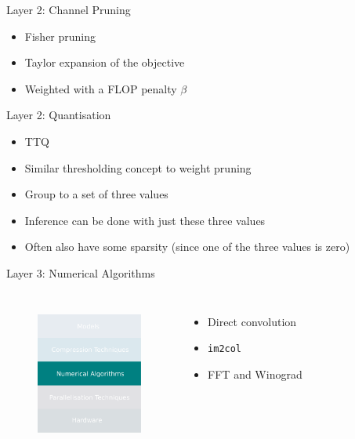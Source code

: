 \documentclass{beamer}
\begin{document}
\begin{frame}{Layer 2: Channel Pruning}
    
\begin{itemize}
    \item Fisher pruning
    \item Taylor expansion of the objective
    \item Weighted with a FLOP penalty $\beta$
\end{itemize}
    
\end{frame}


\begin{frame}{Layer 2: Quantisation}
\begin{itemize}
    \item TTQ
    \item Similar thresholding concept to weight pruning
    \item Group to a set of three values 
    \item Inference can be done with just these three values
    \item Often also have some sparsity (since one of the three values is zero)
\end{itemize}
    
\end{frame}


\begin{frame}{Layer 3: Numerical Algorithms}

\begin{columns}

\begin{figure}
    \centering
    \includegraphics[width=3.5cm]{images/numericals.pdf}
    \label{fig:inference-stack-nums-1}
\end{figure}


\begin{itemize}
    \item Direct convolution
    \item \texttt{im2col}
    \item FFT and Winograd
\end{itemize}

\end{columns}
\end{frame}
\end{document}
